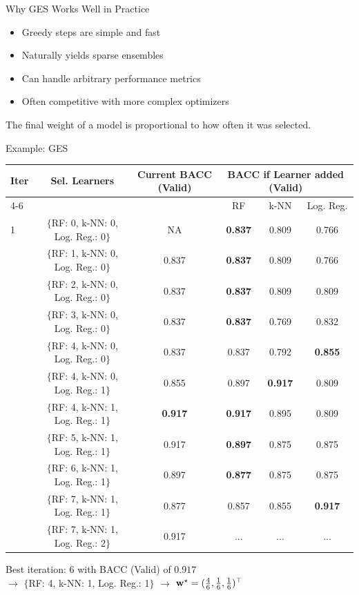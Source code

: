\documentclass[main]{subfiles}
\begin{document}
\begin{frame}{Why GES Works Well in Practice}
\begin{itemize}
    \item Greedy steps are simple and fast
    \item Naturally yields sparse ensembles
    \item Can handle arbitrary performance metrics
    \item Often competitive with more complex optimizers
\end{itemize}
\vspace{0.3cm}
The final weight of a model is proportional to how often it was selected.
\end{frame}

\begin{frame}{Example: GES}
\begin{table}[h]
\footnotesize
\centering
\begin{tabular}{lccccc}
\hline
\textbf{Iter} & \textbf{Sel. Learners} & \textbf{Current BACC} (Valid) & \multicolumn{3}{c}{\textbf{BACC if Learner added} (Valid)}\\ \cline{4-6}
& & & RF & k-NN & Log. Reg.\\ \hline
1  & $\{$RF: 0, k-NN: 0, Log. Reg.: 0$\}$ & NA    & \textbf{0.837} & 0.809 & 0.766\\
\pause
2  & $\{$RF: 1, k-NN: 0, Log. Reg.: 0$\}$ & 0.837 & \textbf{0.837} & 0.809 & 0.766\\
\pause
3  & $\{$RF: 2, k-NN: 0, Log. Reg.: 0$\}$ & 0.837 & \textbf{0.837} & 0.809 & 0.809\\
\pause
4  & $\{$RF: 3, k-NN: 0, Log. Reg.: 0$\}$ & 0.837 & \textbf{0.837} & 0.769 & 0.832\\
\pause
5  & $\{$RF: 4, k-NN: 0, Log. Reg.: 0$\}$ & 0.837 & 0.837 & 0.792 & \textbf{0.855}\\
\pause
6  & $\{$RF: 4, k-NN: 0, Log. Reg.: 1$\}$ & 0.855 & 0.897 & \textbf{0.917} & 0.809\\
\pause
7  & $\{$RF: 4, k-NN: 1, Log. Reg.: 1$\}$ & \textbf{0.917} & \textbf{0.917} & 0.895 & 0.809\\
\pause
8  & $\{$RF: 5, k-NN: 1, Log. Reg.: 1$\}$ & 0.917 & \textbf{0.897} & 0.875 & 0.875\\
\pause
9  & $\{$RF: 6, k-NN: 1, Log. Reg.: 1$\}$ & 0.897 & \textbf{0.877} & 0.875 & 0.875\\
\pause
10 & $\{$RF: 7, k-NN: 1, Log. Reg.: 1$\}$ & 0.877 & 0.857 & 0.855 & \textbf{0.917}\\
\pause
11 & $\{$RF: 7, k-NN: 1, Log. Reg.: 2$\}$ & 0.917 & ... & ... & ...\\
\hline
\end{tabular}
\label{table:learners_valid_test}
\end{table}
\pause
Best iteration: 6 with BACC (Valid) of $0.917$\\
$\rightarrow$ $\{$RF: 4, k-NN: 1, Log. Reg.: 1$\}$ %
$\rightarrow$ $\mathbf{w}^{\star} = (\frac{4}{6}, \frac{1}{6}, \frac{1}{6})^\top$
\end{frame}
\end{document}
